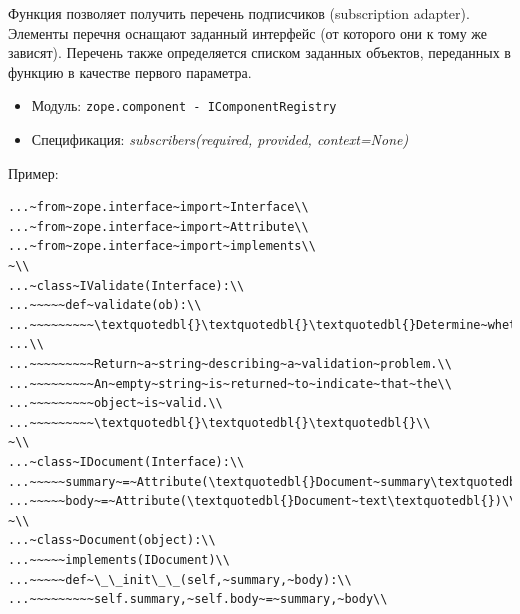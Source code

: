 \documentclass[a4paper,openany,twoside,draft]{book}
\providecommand*{\DUroletitlereference}[1]{\textsl{#1}}
\begin{document}
Функция позволяет получить перечень подписчиков (subscription
adapter).  Элементы перечня оснащают заданный интерфейс (от которого
они к тому же зависят).  Перечень также определяется списком заданных
объектов, переданных в функцию в качестве первого параметра.

\begin{itemize}

\item Модуль: \texttt{zope.component - IComponentRegistry}

\item Спецификация: \DUroletitlereference{subscribers(required, provided, context=None)}

\end{itemize}

Пример:

\begin{verbatim}
...~from~zope.interface~import~Interface\\
...~from~zope.interface~import~Attribute\\
...~from~zope.interface~import~implements\\
~\\
...~class~IValidate(Interface):\\
...~~~~~def~validate(ob):\\
...~~~~~~~~~\textquotedbl{}\textquotedbl{}\textquotedbl{}Determine~whether~the~object~is~valid\\
...\\
...~~~~~~~~~Return~a~string~describing~a~validation~problem.\\
...~~~~~~~~~An~empty~string~is~returned~to~indicate~that~the\\
...~~~~~~~~~object~is~valid.\\
...~~~~~~~~~\textquotedbl{}\textquotedbl{}\textquotedbl{}\\
~\\
...~class~IDocument(Interface):\\
...~~~~~summary~=~Attribute(\textquotedbl{}Document~summary\textquotedbl{})\\
...~~~~~body~=~Attribute(\textquotedbl{}Document~text\textquotedbl{})\\
~\\
...~class~Document(object):\\
...~~~~~implements(IDocument)\\
...~~~~~def~\_\_init\_\_(self,~summary,~body):\\
...~~~~~~~~~self.summary,~self.body~=~summary,~body\\

\end{verbatim}
\end{document}
